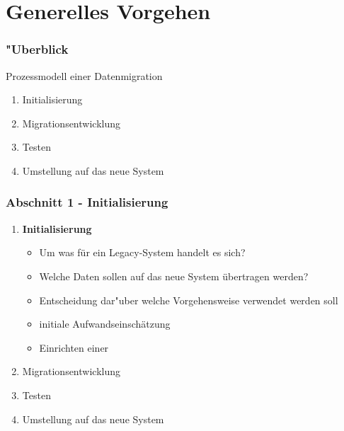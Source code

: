 \documentclass{beamer}
\begin{document}
	\section{Generelles Vorgehen}
	
	\begin{frame}
		\frametitle{"Uberblick}
		
		Prozessmodell einer Datenmigration
		
		\begin{enumerate}
			\item Initialisierung
			
			\item Migrationsentwicklung
			
			\item Testen
			
			\item Umstellung auf das neue System
			
		\end{enumerate}
	\end{frame}
	
	\begin{frame}
		\frametitle{Abschnitt 1 - Initialisierung}
		
		\begin{enumerate}
			\item \textbf{Initialisierung}
			\begin{itemize}
				\item Um was für ein Legacy-System handelt es sich?
				\item Welche Daten sollen auf das neue System übertragen werden?
				\newline
				\item Entscheidung dar"uber welche Vorgehensweise verwendet werden soll
				\item initiale Aufwandseinschätzung
				\item Einrichten einer 
			\end{itemize}
			
			\item Migrationsentwicklung
			
			\item Testen
			
			\item Umstellung auf das neue System
			
		\end{enumerate}
	\end{frame}
	
\end{document}
